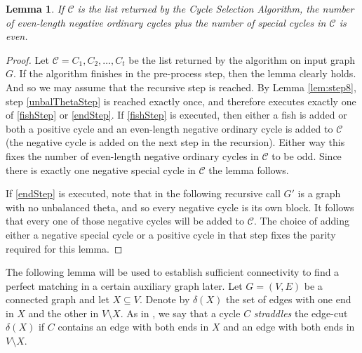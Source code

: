 \documentclass[12pt]{article}
\newtheorem{lemma}[theorem]{Lemma}
\begin{document}
\begin{lemma}\label{CYcSelLast}
    If $\mathcal{C}$ is the list returned by the Cycle Selection Algorithm, the number of even-length negative ordinary cycles plus the number of special cycles in $\mathcal{C}$ is even.
\end{lemma}
\begin{proof}
    Let $\mathcal{C} = C_1, C_2, \dots, C_t$ be the list returned by the algorithm on input graph $G$.
    If the algorithm finishes in the pre-process step, then the lemma clearly holds. And so we may assume that the recursive step is reached. By Lemma \ref{lem:step8}, step \ref{unbalThetaStep} is reached exactly once, and therefore executes exactly one of \ref{fishStep} or \ref{endStep}. If \ref{fishStep} is executed, then either a fish is added or both a positive cycle and an even-length negative ordinary cycle is added to $\mathcal{C}$ (the negative cycle is added on the next step in the recursion). Either way this fixes the number of even-length negative ordinary cycles in $\mathcal{C}$ to be odd. Since there is exactly one negative special cycle in $\mathcal{C}$ the lemma follows.
    
    If \ref{endStep} is executed, note that in the following recursive call $G'$ is a graph with no unbalanced theta, and so every negative cycle is its own block. It follows that every one of those negative cycles will be added to $\mathcal{C}$. The choice of adding either a negative special cycle or a positive cycle in that step fixes the parity required for this lemma.
\end{proof}

The following lemma will be used to establish sufficient connectivity to find a perfect matching in a certain auxiliary graph later. Let $G = (V,E)$ be a connected graph and let $X \subseteq V$. Denote by $\delta(X)$ the set of edges with one end in $X$ and the other in $V\setminus X$. As in \cite{devos2023nowherezero}, we say that a cycle $C$ \emph{straddles} the edge-cut $\delta(X)$ if $C$ contains an edge with both ends in $X$ and an edge with both ends in $V \setminus X$.
\end{document}
